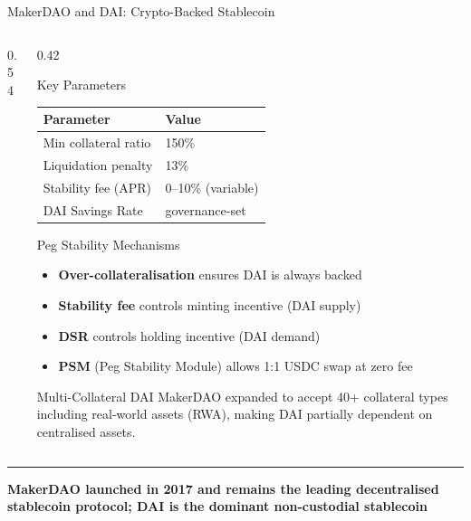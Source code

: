 \documentclass[8pt,aspectratio=169]{beamer}
\newcommand{\bottomnote}[1]{\vfill\vspace{-2mm}\textcolor{mllavender2}{\rule{\textwidth}{0.4pt}}\vspace{1mm}\footnotesize\textbf{#1}}
\begin{document}
\begin{frame}{MakerDAO and DAI: Crypto-Backed Stablecoin}
\begin{columns}[T]
\begin{column}{0.54\textwidth}
    \end{column}
    \begin{column}{0.42\textwidth}
      \begin{block}{Key Parameters}
        \begin{tabular}{ll}
          \toprule
          Parameter & Value \\
          \midrule
          Min collateral ratio & 150\% \\
          Liquidation penalty  & 13\%  \\
          Stability fee (APR)  & 0--10\% (variable) \\
          DAI Savings Rate     & governance-set \\
          \bottomrule
        \end{tabular}
      \end{block}
      \vspace{1mm}
      \begin{block}{Peg Stability Mechanisms}
        \begin{itemize}\setlength\itemsep{1pt}
          \item \textbf{Over-collateralisation} ensures DAI is always backed
          \item \textbf{Stability fee} controls minting incentive (DAI supply)
          \item \textbf{DSR} controls holding incentive (DAI demand)
          \item \textbf{PSM} (Peg Stability Module) allows 1:1 USDC swap at zero fee
        \end{itemize}
      \end{block}
      \vspace{1mm}
      \begin{alertblock}{Multi-Collateral DAI}
        MakerDAO expanded to accept 40+ collateral types including real-world assets (RWA),
        making DAI partially dependent on centralised assets.
      \end{alertblock}
    \end{column}
  \end{columns}
  \bottomnote{MakerDAO launched in 2017 and remains the leading decentralised stablecoin protocol; DAI is the dominant non-custodial stablecoin}
\end{frame}
\end{document}
